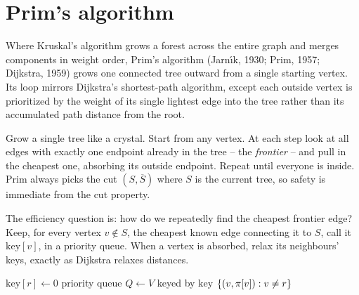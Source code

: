 \section{Prim's algorithm}

Where Kruskal's algorithm grows a forest across the entire graph and merges components in weight order, Prim's algorithm (Jarn\'{\i}k, 1930; Prim, 1957; Dijkstra, 1959) grows one connected tree outward from a single starting vertex. Its loop mirrors Dijkstra's shortest-path algorithm, except each outside vertex is prioritized by the weight of its single lightest edge into the tree rather than its accumulated path distance from the root.

\begin{intuitionbox}
Grow a single tree like a crystal. Start from any vertex. At each step look at all edges with exactly one endpoint already in the tree -- the \emph{frontier} -- and pull in the cheapest one, absorbing its outside endpoint. Repeat until everyone is inside. Prim always picks the cut $(S,\overline S)$ where $S$ is the current tree, so safety is immediate from the cut property.
\end{intuitionbox}

The efficiency question is: how do we repeatedly find the cheapest frontier edge? Keep, for every vertex $v\notin S$, the cheapest known edge connecting it to $S$, call it $\mathrm{key}[v]$, in a priority queue. When a vertex is absorbed, relax its neighbours' keys, exactly as Dijkstra relaxes distances.

\begin{algorithm}[H]
\caption{Prim-MST (binary-heap version)}
\label{ch06:prim}
$\mathrm{key}[r]\gets 0$\;
priority queue $Q\gets V$ keyed by $\mathrm{key}$\;
\Return $\{(v,\pi[v]):v\ne r\}$\;
\end{algorithm}

